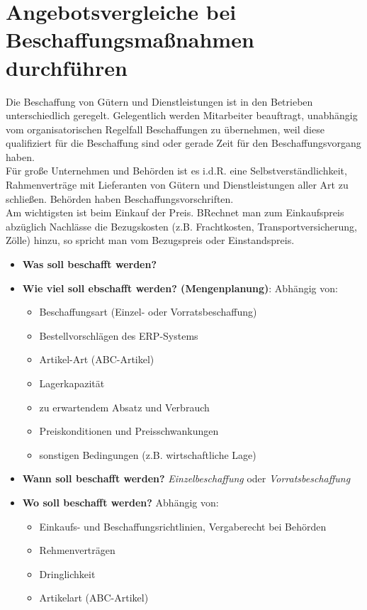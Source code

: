 \documentclass[a4paper, 12pt]{report}
\begin{document}

\section{Angebotsvergleiche bei Beschaffungsmaßnahmen durchführen}

Die Beschaffung von Gütern und Dienstleistungen ist in den Betrieben 
unterschiedlich geregelt. Gelegentlich werden Mitarbeiter beauftragt, unabhängig
vom organisatorischen Regelfall Beschaffungen zu übernehmen, weil diese 
qualifiziert für die Beschaffung sind oder gerade Zeit für den 
Beschaffungsvorgang haben. \\

Für große Unternehmen und Behörden ist es i.d.R. eine Selbstverständlichkeit, 
Rahmenverträge mit Lieferanten von Gütern und Dienstleistungen aller Art zu 
schließen. Behörden haben Beschaffungsvorschriften. \\

Am wichtigsten ist beim Einkauf der Preis. BRechnet man zum Einkaufspreis 
abzüglich Nachlässe die Bezugskosten (z.B. Frachtkosten, Transportversicherung, 
Zölle) hinzu, so spricht man vom Bezugspreis oder Einstandspreis. \\

\begin{itemize}
    \item \textbf{Was soll beschafft werden?} 
    \item \textbf{Wie viel soll ebschafft werden? (Mengenplanung)}: Abhängig 
        von:
    \begin{itemize}
        \item Beschaffungsart (Einzel- oder Vorratsbeschaffung)
        \item Bestellvorschlägen des ERP-Systems
        \item Artikel-Art (ABC-Artikel)
        \item Lagerkapazität
        \item zu erwartendem Absatz und Verbrauch 
        \item Preiskonditionen und Preisschwankungen
        \item sonstigen Bedingungen (z.B. wirtschaftliche Lage)
    \end{itemize}
    \item \textbf{Wann soll beschafft werden?} \emph{Einzelbeschaffung} oder 
        \emph{Vorratsbeschaffung}
    \item \textbf{Wo soll beschafft werden?} Abhängig von:
    \begin{itemize}
        \item Einkaufs- und Beschaffungsrichtlinien, Vergaberecht bei Behörden
        \item Rehmenverträgen
        \item Dringlichkeit
        \item Artikelart (ABC-Artikel)
    \end{itemize}
\end{itemize}
\end{document}

